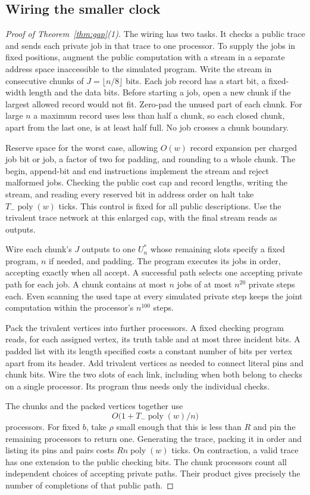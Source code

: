 \subsection{Wiring the smaller clock}
\begin{proof}[Proof of Theorem~\ref{thm:gap}(1)]
The wiring has two tasks. It checks a public trace and sends each
private job in that trace to one processor. To supply the jobs in
fixed positions, augment the public computation with a stream in a
separate address space inaccessible to the simulated program. Write the stream in consecutive chunks of
$J=\lfloor n/8\rfloor$ bits. Each job record has a start bit, a
fixed-width length and the data bits. Before starting a job, open a
new chunk if the largest allowed record would not fit. Zero-pad the
unused part of each chunk. For large $n$ a maximum record uses less
than half a chunk, so each closed chunk, apart from the last one, is
at least half full. No job crosses a chunk boundary.

Reserve space for the worst case, allowing $O(w)$ record expansion
per charged job bit or job, a factor of two for padding, and rounding
to a whole chunk. The begin, append-bit and end instructions implement
the stream and reject malformed jobs. Checking the public cost cap
and record lengths, writing the stream, and reading every reserved bit
in address order on halt take $T_-\operatorname{poly}(w)$ ticks.
This control is fixed for all public descriptions. Use the trivalent
trace network at this enlarged cap, with the final stream reads as
outputs.

Wire each chunk's $J$ outputs to one $U_n^*$ whose remaining slots
specify a fixed program, $n$ if needed, and padding. The program
executes its jobs in order, accepting exactly when all accept. A
successful path selects one accepting private path for each job.
A chunk contains at most $n$ jobs of at most $n^{20}$ private steps
each. Even scanning the used tape at every simulated private step
keeps the joint computation within the processor's $n^{100}$ steps.

Pack the trivalent vertices into further processors. A fixed checking
program reads, for each assigned vertex, its truth table and at most
three incident bits. A padded list with its length specified costs a
constant number of bits per vertex apart from its header. Add trivalent
vertices as needed to connect literal pins and chunk bits. Wire the
two slots of each link, including when both belong to checks on a
single processor. Its program thus needs only the
individual checks.

The chunks and the packed vertices together use
\[
           O\bigl(1+T_-\operatorname{poly}(w)/n\bigr)
\]
processors. For fixed $b$, take $\rho$ small enough that this is less
than $R$ and pin the remaining processors to return one. Generating
the trace, packing it in order and listing its pins and pairs costs
$Rn\operatorname{poly}(w)$ ticks. On contraction, a valid trace has
one extension to the public checking bits. The chunk processors count
all independent choices of accepting private paths. Their product
gives precisely the number of completions of that public path.
\end{proof}

